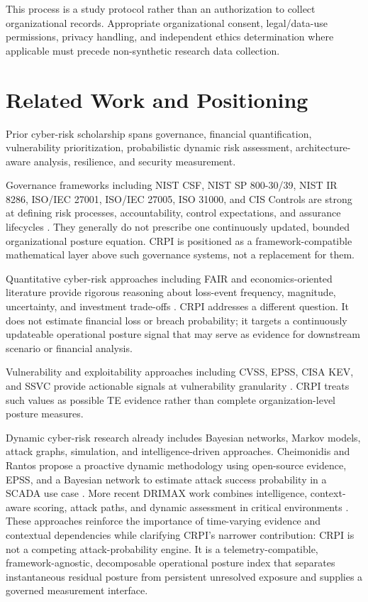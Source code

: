 \documentclass[11pt]{article}
\begin{document}
This process is a study protocol rather than an
authorization to collect organizational records.
Appropriate organizational consent, legal/data-use
permissions, privacy handling, and independent
ethics determination where applicable must precede
non-synthetic research data collection.

\section{Related Work and Positioning}
\label{sec:related}
Prior cyber-risk scholarship spans governance, financial quantification, vulnerability
prioritization, probabilistic dynamic risk assessment, architecture-aware analysis,
resilience, and security measurement.

Governance frameworks including NIST CSF, NIST SP 800-30/39, NIST IR 8286, ISO/IEC
27001, ISO/IEC 27005, ISO 31000, and CIS Controls are strong at defining risk processes,
accountability, control expectations, and assurance lifecycles
\cite{nist-csf,nist80030,nist80039,nistir8286r1,iso27001,iso27005,iso31000,cis-controls}.
They generally do not prescribe one continuously updated, bounded organizational
posture equation. CRPI is positioned as a framework-compatible mathematical layer above
such governance systems, not a replacement for them.

Quantitative cyber-risk approaches including FAIR and economics-oriented literature
provide rigorous reasoning about loss-event frequency, magnitude, uncertainty, and
investment trade-offs \cite{fair-book,openfair-bok,gordon-loeb,biener-eling-wirfs,he-jin-li}.
CRPI addresses a different question. It does not estimate financial loss or breach
probability; it targets a continuously updateable operational posture signal that may
serve as evidence for downstream scenario or financial analysis.

Vulnerability and exploitability approaches including CVSS, EPSS, CISA KEV, and SSVC
provide actionable signals at vulnerability granularity
\cite{cvss31,cvss40,epss,cisa-kev,cisa-ssvc}. CRPI treats such values as possible TE
evidence rather than complete organization-level posture measures.

Dynamic cyber-risk research already includes Bayesian networks, Markov models, attack
graphs, simulation, and intelligence-driven approaches. Cheimonidis and Rantos propose
a proactive dynamic methodology using open-source evidence, EPSS, and a Bayesian
network to estimate attack success probability in a SCADA use case
\cite{cheimonidis-rantos-2025}. More recent DRIMAX work combines intelligence,
context-aware scoring, attack paths, and dynamic assessment in critical environments
\cite{drimax-2026}. These approaches reinforce the importance of time-varying evidence
and contextual dependencies while clarifying CRPI's narrower contribution: CRPI is not a
competing attack-probability engine. It is a telemetry-compatible, framework-agnostic,
decomposable operational posture index that separates instantaneous residual posture
from persistent unresolved exposure and supplies a governed measurement interface.
\end{document}
